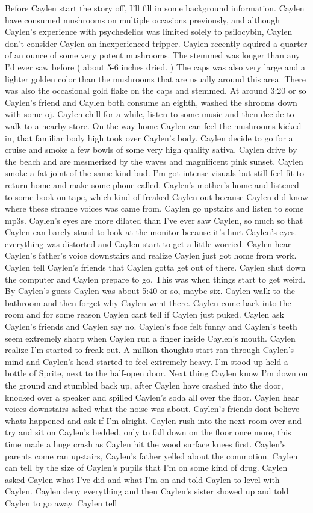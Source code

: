 \documentclass[12pt]{book}
\begin{document}
Before Caylen start the story off, I'll fill in some background information. Caylen have consumed mushrooms on multiple occasions previously, and although Caylen's experience with psychedelics was limited solely to psilocybin, Caylen don't consider Caylen an inexperienced tripper. Caylen recently aquired a quarter of an ounce of some very potent mushrooms. The stemmed was longer than any I'd ever saw before ( about 5-6 inches dried. ) The caps was also very large and a lighter golden color than the mushrooms that are usually around this area. There was also the occasional gold flake on the caps and stemmed. At around 3:20 or so Caylen's friend and Caylen both consume an eighth, washed the shrooms down with some oj. Caylen chill for a while, listen to some music and then decide to walk to a nearby store. On the way home Caylen can feel the mushrooms kicked in, that familiar body high took over Caylen's body. Caylen decide to go for a cruise and smoke a few bowls of some very high quality sativa. Caylen drive by the beach and are mesmerized by the waves and magnificent pink sunset. Caylen smoke a fat joint of the same kind bud. I'm got intense visuals but still feel fit to return home and make some phone called. Caylen's mother's home and listened to some book on tape, which kind of freaked Caylen out because Caylen did know where these strange voices was came from. Caylen go upstairs and listen to some mp3s. Caylen's eyes are more dilated than I've ever saw Caylen, so much so that Caylen can barely stand to look at the monitor because it's hurt Caylen's eyes. everything was distorted and Caylen start to get a little worried. Caylen hear Caylen's father's voice downstairs and realize Caylen just got home from work. Caylen tell Caylen's friends that Caylen gotta get out of there. Caylen shut down the computer and Caylen prepare to go. This was when things start to get weird. By Caylen's guess Caylen was about 5:40 or so, maybe six. Caylen walk to the bathroom and then forget why Caylen went there. Caylen come back into the room and for some reason Caylen cant tell if Caylen just puked. Caylen ask Caylen's friends and Caylen say no. Caylen's face felt funny and Caylen's teeth seem extremely sharp when Caylen run a finger inside Caylen's mouth. Caylen realize I'm started to freak out. A million thoughts start ran through Caylen's mind and Caylen's head started to feel extremely heavy. I'm stood up held a bottle of Sprite, next to the half-open door. Next thing Caylen know I'm down on the ground and stumbled back up, after Caylen have crashed into the door, knocked over a speaker and spilled Caylen's soda all over the floor. Caylen hear voices downstairs asked what the noise was about. Caylen's friends dont believe whats happened and ask if I'm alright. Caylen rush into the next room over and try and sit on Caylen's bedded, only to fall down on the floor once more, this time made a huge crash as Caylen hit the wood surface knees first. Caylen's parents come ran upstairs, Caylen's father yelled about the commotion. Caylen can tell by the size of Caylen's pupils that I'm on some kind of drug. Caylen asked Caylen what I've did and what I'm on and told Caylen to level with Caylen. Caylen deny everything and then Caylen's sister showed up and told Caylen to go away. Caylen tell 
\end{document}
